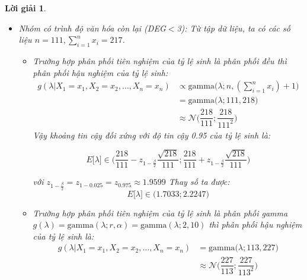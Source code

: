 \documentclass[14pt, a4paper]{article}
\theoremstyle{sltheorem}
\theoremstyle{soltheorem}
\newtheorem*{loigiai}{Lời giải}
\begin{document}
\begin{loigiai}
\begin{enumerate}
\begin{itemize}
\begin{itemize}
            \item Nhóm có trình độ văn hóa còn lại (DEG$<$3):
            Từ tập dữ liệu, ta có các số liệu $n=111, \sum_{i=1}^n x_i=217$.
                \begin{itemize}
                    \item Trường hợp phân phối tiên nghiệm của tỷ lệ sinh là phân phối đều thì phân phối hậu nghiệm của tỷ lệ sinh:
                    \begin{equation*}
                        \begin{aligned}
                            g(\lambda \vert X_1 =x_1, X_2=x_2, \dots, X_n=x_n) &\propto \text{gamma}\big(\lambda; n, (\sum_{i=1}^n x_i) + 1\big) \\
                            &= \text{gamma}\big(\lambda; 111, 218\big) \\
                            &\approx \mathcal{N} \Big( \dfrac{218}{111}; \dfrac{218}{111^2} \Big)
                        \end{aligned}
                    \end{equation*}
                    Vậy khoảng tin cậy đối xứng với độ tin cậy 0.95 của tỷ lệ sinh là:

                \begin{equation*}
                    E \lbrack \lambda \rbrack \in \Big( \dfrac{218}{111} - z_{1-\frac{\beta}{2}} \dfrac{\sqrt{218}}{111};\dfrac{218}{111} + z_{1-\frac{\beta}{2}} \dfrac{\sqrt{218}}{111} \Big) 
                \end{equation*}
                
                với $z_{1-\frac{\beta}{2}}=z_{1-0.025}=z_{0.975}\approx1.9599$
                Thay số ta được:
                \begin{equation*}
                    E \lbrack \lambda \rbrack \in \Big( 1.7033; 2.2247 \Big)
                \end{equation*}
                \item Trường hợp phân phối tiên nghiệm của tỷ lệ sinh là phân phối gamma $g(\lambda) = \text{gamma}(\lambda; r, \alpha)=\text{gamma}(\lambda; 2, 10)$ thì phân phối hậu nghiệm của tỷ lệ sinh là:
                \begin{equation*}
                    \begin{aligned}
                        g(\lambda \vert X_1 =x_1, X_2=x_2, \dots, X_n=x_n) &= \text{gamma}\big(\lambda; 113, 227 \big) \\
                        &\approx\mathcal{N}\Big(\dfrac{227}{113};\dfrac{227}{113^2})
                    \end{aligned}
                \end{equation*}


\end{itemize}
\end{itemize}
\end{itemize}
\end{enumerate}
\end{loigiai}
\end{document}
